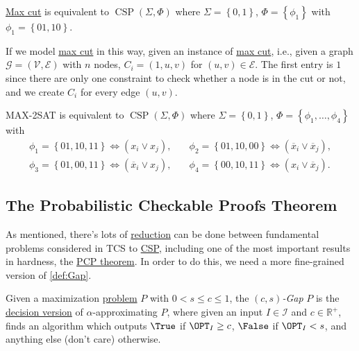 \begin{eg}
	\hyperref[prb:max-cut]{Max cut} is equivalent to \(\mathop{\mathrm{CSP}}(\Sigma , \Phi )\) where \(\Sigma = \left\{ 0, 1 \right\} \), \(\Phi = \left\{ \phi _1 \right\} \) with \(\phi _1 = \left\{ 01, 10 \right\}\).
\end{eg}
\begin{explanation}
	If we model \hyperref[prb:max-cut]{max cut} in this way, given an instance of \hyperref[prb:max-cut]{max cut}, i.e., given a graph \(\mathcal{G} =(\mathcal{V} , \mathcal{E} )\) with \(n\) nodes, \(C_i = (1, u, v)\) for \((u, v)\in \mathcal{E} \). The first entry is \(1\) since there are only one constraint to check whether a node is in the cut or not, and we create \(C_i\) for every edge \((u, v)\).
\end{explanation}

\begin{eg}
	MAX-2SAT is equivalent to \(\mathop{\mathrm{CSP}}(\Sigma , \Phi )\) where \(\Sigma = \left\{ 0, 1 \right\} \), \(\Phi =\left\{ \phi _1, \ldots , \phi _4  \right\} \) with
	\[
		\begin{split}
			\phi _1 = \left\{ 01, 10, 11 \right\} \iff (x_i \lor x_j), &\quad
			\phi _2 = \left\{ 01, 10, 00 \right\} \iff (\overline{x}_i \lor \overline{x}_j),\\
			\phi _3 = \left\{ 01, 00, 11 \right\} \iff (\overline{x}_i \lor x_j), &\quad
			\phi _4 = \left\{ 00, 10, 11 \right\} \iff (x_i \lor \overline{x}_j).
		\end{split}
	\]
\end{eg}
\subsection{The Probabilistic Checkable Proofs Theorem}
As mentioned, there's lots of \hyperref[def:reduction]{reduction} can be done between fundamental problems considered in TCS to \hyperref[prb:CSP]{CSP}, including one of the most important results in hardness, the \hyperref[thm:PCP]{PCP theorem}. In order to do this, we need a more fine-grained version of \autoref{def:Gap}.

\begin{definition}[\((c, s)\)-Gap]\label{def:c-s-Gap}
	Given a maximization \hyperref[def:combinatorial-optimization]{problem} \(P\) with \(0 < s \leq c \leq 1\), the \emph{\((c, s)\)-Gap} \(P\) is the \hyperref[def:decision-P]{decision version} of \(\alpha\)-approximating \(P\), where given an input \(I\in \mathcal{I} \) and \(c\in \mathbb{R} ^+\), finds an algorithm which outputs \(\True\) if \(\OPT_I \geq c\), \(\False\) if \(\OPT_I < s\), and anything else (don't care) otherwise.
\end{definition}

